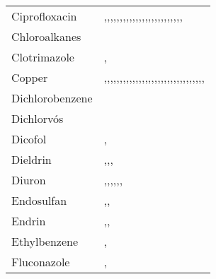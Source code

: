 \begin{tabular}{ll}
\cline{1-2}
Ciprofloxacin & \cite{Kim_2009},\cite{Rahmani_2018},\cite{Feder_2015},\cite{Javid_2020},\cite{Coutu_2013},\cite{Brtnick__2019},\cite{Ortiz_de_Garc_a_2013},\cite{Castrignan__2020},\cite{Heaney_2015},\cite{Al_Maadheed_2019},\cite{K_mmerer_2000},\cite{Rizzo_2019},\cite{Tewari_2013},\cite{Arany_2014},\cite{Meng_2015},\cite{Alder_2004},\cite{Casta_o_Trias_2020},\cite{Garoma_2010},\cite{Miyazono_2015},\cite{Verlicchi_2014},\cite{Ros_n_2015},\cite{Garc_a_Rey_2006},\cite{Altenburger_2015},\cite{Uski_2015},\cite{Zhao_2015},\cite{K_mmerer_2003} \\
\cline{1-2}
Chloroalkanes & \cite{Mailler_2013} \\
\cline{1-2}
Clotrimazole & \cite{Liu_2017},\cite{Juksu_2019} \\
\cline{1-2}
Copper & \cite{Lester_1979},\cite{da_Silva_Oliveira_2007},\cite{SORME_2002},\cite{Yoshida_2015},\cite{Mass__1995},\cite{Feng_2018},\cite{Marzougui_2018},\cite{Johnson_2008},\cite{Buzier_2006},\cite{Gupta_1998},\cite{Orescanin_2013},\cite{Busetti_2005},\cite{Goldstone_1990},\cite{Choubert_2011},\cite{Pagliaccia_2022},\cite{Stoveland_1979},\cite{Moriyama_1988},\cite{Drozdova_2018},\cite{Honarmandrad_2020},\cite{Brown_1973},\cite{Sterritt_1981},\cite{Hargreaves_2016},\cite{Karvelas_2003},\cite{Mahmoudkhani_2014},\cite{Lester_1983},\cite{Mansourri_2016},\cite{Mailler_2013},\cite{Zhou_2018},\cite{Yuan_2020},\cite{OLIVER_1974},\cite{Edokpayi_2015},\cite{Sudo_1973},\cite{Gardner_2013} \\
\cline{1-2}
Dichlorobenzene & \cite{Mailler_2013} \\
\cline{1-2}
Dichlorvós & \cite{Stamatis_2010} \\
\cline{1-2}
Dicofol & \cite{Ormad_2008},\cite{RAHMANI201882} \\
\cline{1-2}
Dieldrin & \cite{Ormad_2008},\cite{RAHMANI201882},\cite{Mailler_2013},\cite{Katsoyiannis_2004} \\
\cline{1-2}
Diuron & \cite{Teijon_2010},\cite{Mailler_2013},\cite{RAHMANI201882},\cite{Ormad_2008},\cite{Kruithof2007-os},\cite{Kruithof_2007},\cite{Echevarr_a_2019} \\
\cline{1-2}
Endosulfan & \cite{Ormad_2008},\cite{RAHMANI201882},\cite{Katsoyiannis_2004} \\
\cline{1-2}
Endrin & \cite{Ormad_2008},\cite{RAHMANI201882},\cite{Katsoyiannis_2004} \\
\cline{1-2}
Ethylbenzene & \cite{Bhattacharya_1996},\cite{Shammay_2018} \\
\cline{1-2}
Fluconazole & \cite{Liu_2017},\cite{Juksu_2019} \\

\end{tabular}

